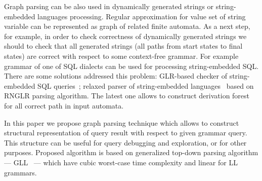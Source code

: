 \documentclass{sig-alternate} %
\begin{document}
Graph parsing can be also used in dynamically generated strings or string-embedded languages processing. 
Regular approximation for value set of string variable can be represented as graph of related finite automata.
As a next step, for example, in order to check correctness of dynamically generated strings we should to check that all generated strings (all paths from start states to final states) are correct with respect to some context-free grammar.
For example grammar of one of SQL dialects can be used for processing string-embedded SQL.
There are some solutions addressed this problem: GLR-based checker of string-embedded SQL queries~\cite{Alvor1, Alvor2};
relaxed parser of string-embedded languages~\cite{relaxedRNGLR} based on RNGLR parsing algorithm. The latest one allows to construct derivation forest for all correct path in input automata.

In this paper we propose graph parsing technique which allows to construct structural representation of query result with respect to given grammar query.
This structure can be useful for query debugging and exploration, or for other purposes. 
Proposed algorithm is based on generalized top-down parsing algorithm --- GLL~\cite{GLL} --- which have cubic worst-case time complexity and linear for LL grammars.  













\end{document}
